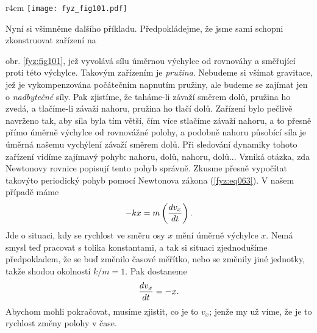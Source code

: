 {    \begin{wrapfigure}[12]{r}{4cm}  %
      \centering
      \texttt{[image: fyz\_fig101.pdf]}
      \caption{Závaží na pružině (\cite[s.~127]{Feynman01})}
      \label{fyz:fig101}
    \end{wrapfigure}
    Nyní si všimněme dalšího příkladu. Předpokládejme, že jsme sami schopni zkonstruovat zařízení na
    {obr. \ref{fyz:fig101}, jež vyvolává sílu úměrnou výchylce od rovnováhy a směřující proti této 
    výchylce. Takovým zařízením je \emph{pružina}. Nebudeme si všímat gravitace, jež je 
    vykompenzována počátečním napnutím pružiny, ale budeme se zajímat jen o \emph{nadbytečné} síly. 
    Pak zjistíme, že taháme-li závaží směrem dolů, pružina ho zvedá, a tlačíme-li závaží nahoru, 
    pružina ho tlačí dolů. Zařízení bylo pečlivě navrženo tak, aby síla byla tím větší, čím více 
    stlačíme závaží nahoru, a to přesně přímo úměrně výchylce od rovnovážné polohy, a podobně 
    nahoru působící síla je úměrná našemu vychýlení závaží směrem dolů. Při sledování dynamiky 
    tohoto zařízení vidíme zajímavý pohyb: nahoru, dolů, nahoru, dolů... Vzniká otázka, zda 
    Newtonovy rovnice popisují tento pohyb správně. Zkusme přesně vypočítat takovýto periodický 
    pohyb pomocí Newtonova zákona (\ref{fyz:eq063}). V našem případě máme
    \begin{equation}\label{FYZ:eq128}
      -kx = m\left(\frac{d v_x}{d t}\right).
    \end{equation}
    Jde o situaci, kdy se rychlost ve směru osy \(x\) mění úměrně výchylce \(x\). Nemá smysl teď 
    pracovat s tolika konstantami, a tak si situaci zjednodušíme předpokladem, že se buď změnilo 
    časové měřítko, nebo se změnily jiné jednotky, takže shodou okolností \(k/m = 1\). Pak dostaneme
    \begin{equation}\label{FYZ:eq129}
      \frac{d v_x}{d t} = -x.
    \end{equation}
    Abychom mohli pokračovat, musíme zjistit, co je to \(v_x\); jenže my už víme, že je to rychlost 
    změny polohy v čase.
    
}}
